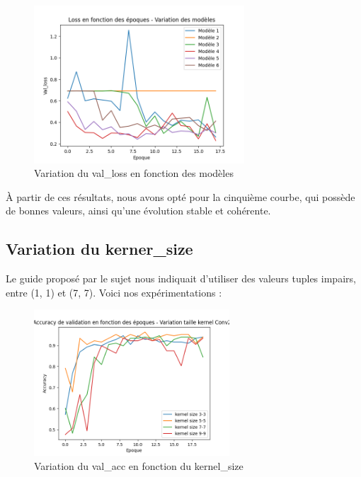 \documentclass{rapport}
\begin{document}
        \begin{figure}[H]
            \centering
            \includegraphics[width=0.7\textwidth]{rapport/plots/model_loss.png}
            \caption{Variation du val\_loss en fonction des modèles}
            \label{fig:mesh2_model}
        \end{figure}
        
        À partir de ces résultats, nous avons opté pour la cinquième courbe, qui possède de bonnes valeurs, ainsi qu'une évolution stable et cohérente.
        
        \newpage
        \subsection{Variation du kerner\_size}
        Le guide proposé par le sujet nous indiquait d'utiliser des valeurs tuples impairs, entre (1, 1) et (7, 7). Voici nos expérimentations :
        
        \begin{figure}[H]
            \centering
            \includegraphics[width=0.65\textwidth]{rapport/plots/kernel_acc.png}
            \caption{Variation du val\_acc en fonction du kernel\_size}
            \label{fig:mesh1}
        \end{figure}
\end{document}
